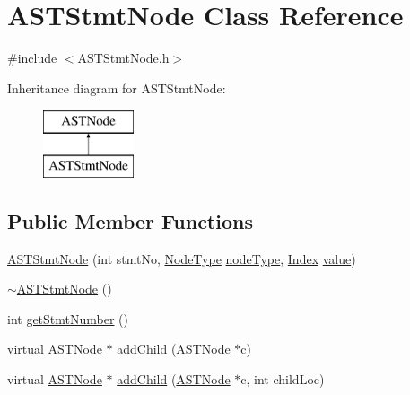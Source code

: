\hypertarget{class_a_s_t_stmt_node}{\section{A\-S\-T\-Stmt\-Node Class Reference}
\label{class_a_s_t_stmt_node}
}


{\ttfamily \#include $<$A\-S\-T\-Stmt\-Node.\-h$>$}

Inheritance diagram for A\-S\-T\-Stmt\-Node\-:\begin{figure}[H]
\begin{center}
\leavevmode
\includegraphics[height=2.000000cm]{class_a_s_t_stmt_node}
\end{center}
\end{figure}
\subsection*{Public Member Functions}
\begin{DoxyCompactItemize}
\item 
\hyperlink{class_a_s_t_stmt_node_abf3ac4ab701786816ee76defcdb3c328}{A\-S\-T\-Stmt\-Node} (int stmt\-No, \hyperlink{class_a_s_t_node_a4fd016b5f0e44ea6aca3542d27de3859}{Node\-Type} \hyperlink{class_a_s_t_node_a15fcdbd8403a1169b06d948a827fde55}{node\-Type}, \hyperlink{_a_s_t_stmt_node_8h_a4a0e50e01fef3e431767a928c2631cab}{Index} \hyperlink{class_a_s_t_node_a136d1712e8cfdeb4908aceb22abc3de7}{value})
\item 
\hyperlink{class_a_s_t_stmt_node_ac80a1656c17e5e55dff7285fd37dc313}{$\sim$\-A\-S\-T\-Stmt\-Node} ()
\item 
int \hyperlink{class_a_s_t_stmt_node_a7ccabe8c03f4ba0eb31ac4850725c4e2}{get\-Stmt\-Number} ()
\item 
virtual \hyperlink{class_a_s_t_node}{A\-S\-T\-Node} $\ast$ \hyperlink{class_a_s_t_stmt_node_a0396498d6bbccecd8a71a4251d237380}{add\-Child} (\hyperlink{class_a_s_t_node}{A\-S\-T\-Node} $\ast$c)
\item 
virtual \hyperlink{class_a_s_t_node}{A\-S\-T\-Node} $\ast$ \hyperlink{class_a_s_t_stmt_node_aa265b32dab6bb7fcb8b7f1e8a9687f9a}{add\-Child} (\hyperlink{class_a_s_t_node}{A\-S\-T\-Node} $\ast$c, int child\-Loc)
\end{DoxyCompactItemize}
